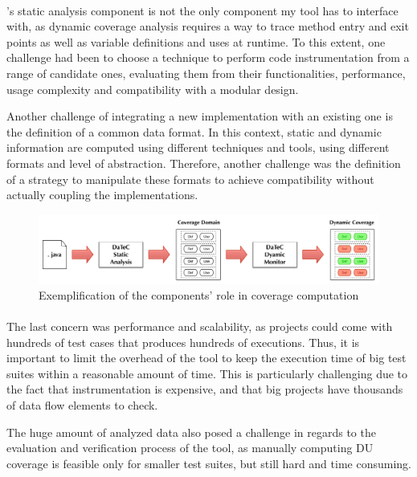 \paragraph{}
\datec's static analysis component is not the only component my tool has to interface with, as dynamic coverage analysis requires 
a way to trace method entry and exit points as well as variable definitions and uses at runtime. To this extent, one challenge had been  
to choose a technique to perform code instrumentation from a range of candidate ones, evaluating them from their functionalities, performance,  usage complexity and compatibility with a modular design. 

Another challenge of integrating a new implementation with an existing one is the definition of a common data format. In this context, static and dynamic information are computed using different techniques and tools, using different formats and level of abstraction. Therefore, another challenge was the definition of a strategy to manipulate these formats to achieve compatibility without actually coupling the implementations. 

 \begin{figure}[h]
   \includegraphics[width=\textwidth]{./Images/tool_highlevel.pdf}
   \caption{Exemplification of the components' role in coverage computation}
  \label{schema}
 \end{figure}

\paragraph{}
The last concern was performance and scalability, as projects could come with hundreds of test cases that produces hundreds of executions. Thus, it is important to limit the overhead of the tool to keep the execution time of big test suites within a reasonable amount of time. This is particularly challenging due to the fact that instrumentation is expensive, and that big projects have thousands of data flow elements to check.

The huge amount of analyzed data also posed a challenge in regards to the evaluation and 
verification process of the tool, as manually computing DU coverage is feasible 
only for smaller test suites, but still hard and time consuming. 